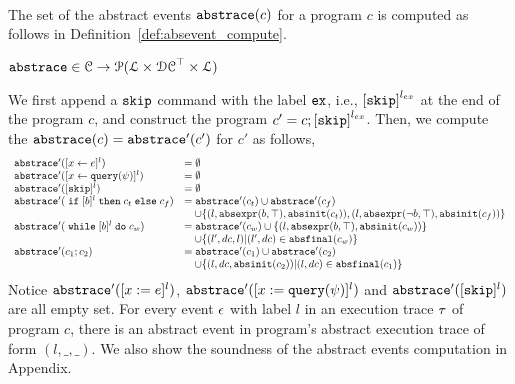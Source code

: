\\
The set of the abstract events $\mathtt{abs}{\mathtt{trace}}(c)$ for a program $c$
is computed as follows in Definition~\ref{def:absevent_compute}.
 \begin{defn}
 \label{def:absevent_compute}
  $\mathtt{abs}{\mathtt{trace}} \in \mathcal{C} \to \mathcal{P}( \mathcal{L} \times \mathcal{DC}^{\top} \times \mathcal{L} )$
  \end{defn}
 We first append a $\mathtt{skip}$ command with 
the label $\mathtt{ex}$, i.e., $\clabel{\eskip}^{l_{ex}}$ at the end of the program $c$, and construct 
the program $c' = c;\clabel{\eskip}^{l_{ex}}$.
Then, we compute the $\mathtt{abs}{\mathtt{trace}}(c) = \mathtt{abs}{\mathtt{trace}}'(c')$ for $c'$ as follows,
 {\footnotesize
 \[
   \begin{array}{ll}
      \absflow'(\clabel{\assign{x}{\expr}}{}^l)  & = \emptyset  \\
      \absflow'(\clabel{\assign{x}{\query(\qexpr)}}{}^l)  & = \emptyset  \\
      \absflow'([\eskip]^{l})  & = \emptyset \\
      \absflow'(\eif [b]^l \ethen c_t \eelse c_f)  & =  \absflow'(c_t) \cup \absflow'(c_f)
        \\ & \quad 
        \cup \{(l, \absexpr(\bexpr, \top),  \absinit(c_t) ) ,  (l, \absexpr(\neg\bexpr, \top), \absinit(c_f)) \} \\
       \absflow'(\ewhile [b]^l \edo c_w)  & =  \absflow'(c_w) \cup \{(l, \absexpr(\bexpr, \top), \absinit(c_w)) \} 
       \\ & \quad 
       \cup \{(l', dc, l)| (l', dc) \in \absfinal(c_w) \} \\
       \absflow'(c_1 ; c_2)  & = \absflow'(c_1) \cup  \absflow'(c_2) 
       \\ & \quad 
       \cup \{ (l, dc, \absinit(c_2)) | (l, dc) \in \absfinal(c_1) \} \\
   \end{array}
   \]
   }
   Notice $\mathtt{abs}{\mathtt{trace}}'([x := e]^{l})$, $\mathtt{abs}{\mathtt{trace}}'([x := {\tt query}(\psi)]^{l})$ and $\mathtt{abs}{\mathtt{trace}}'([\mathtt{skip}]^{l})$ are all empty set. 
   For every event $\mathtt{\epsilon}$ with label $l$ in an execution trace $\mathtt{\tau}$ of program $c$, 
   there is an abstract event in program's abstract execution trace of form $(l, \_, \_)$.  
   We also show the soundness of the abstract events computation in Appendix.

